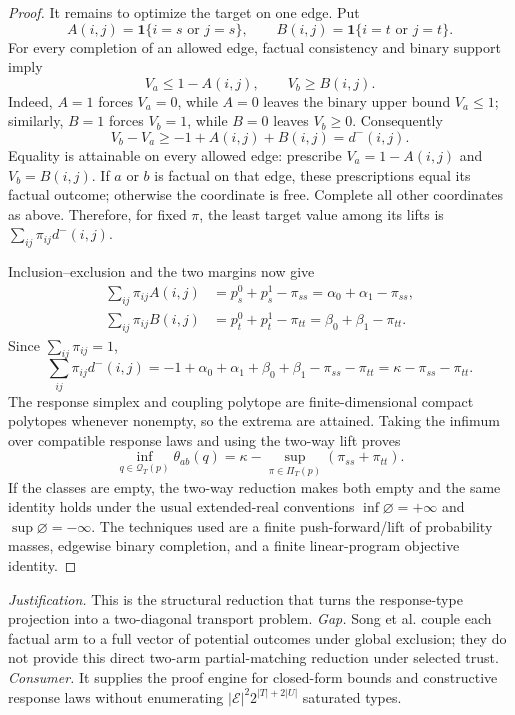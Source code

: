 \documentclass{article}
\begin{document}
\begin{proof}
It remains to optimize the target on one edge.  Put
\[
 A(i,j)=\mathbf 1\{i=s\text{ or }j=s\},
 \qquad
 B(i,j)=\mathbf 1\{i=t\text{ or }j=t\}.
\]
For every completion of an allowed edge, factual consistency and binary
support imply
\[
 V_a\le 1-A(i,j),\qquad V_b\ge B(i,j).
\]
Indeed, \(A=1\) forces \(V_a=0\), while \(A=0\) leaves the binary upper
bound \(V_a\le1\); similarly, \(B=1\) forces \(V_b=1\), while \(B=0\)
leaves \(V_b\ge0\).  Consequently
\[
 V_b-V_a\ge-1+A(i,j)+B(i,j)=d^-(i,j).
\]
Equality is attainable on every allowed edge: prescribe
\(V_a=1-A(i,j)\) and \(V_b=B(i,j)\).  If \(a\) or \(b\) is factual on that
edge, these prescriptions equal its factual outcome; otherwise the
coordinate is free.  Complete all other coordinates as above.  Therefore,
for fixed \(\pi\), the least target value among its lifts is
\(\sum_{ij}\pi_{ij}d^-(i,j)\).

Inclusion--exclusion and the two margins now give
\[
\begin{aligned}
 \sum_{ij}\pi_{ij}A(i,j)
 &=p_s^0+p_s^1-\pi_{ss}=\alpha_0+\alpha_1-\pi_{ss},\\
 \sum_{ij}\pi_{ij}B(i,j)
 &=p_t^0+p_t^1-\pi_{tt}=\beta_0+\beta_1-\pi_{tt}.
\end{aligned}
\]
Since \(\sum_{ij}\pi_{ij}=1\),
\[
 \sum_{ij}\pi_{ij}d^-(i,j)
 =-1+\alpha_0+\alpha_1+\beta_0+\beta_1-\pi_{ss}-\pi_{tt}
 =\kappa-\pi_{ss}-\pi_{tt}.
\]
The response simplex and coupling polytope are finite-dimensional compact
polytopes whenever nonempty, so the extrema are attained.  Taking the
infimum over compatible response laws and using the two-way lift proves
\[
 \inf_{q\in\mathcal Q_T(p)}\theta_{ab}(q)
 =\kappa-\sup_{\pi\in\Pi_T(p)}(\pi_{ss}+\pi_{tt}).
\]
If the classes are empty, the two-way reduction makes both empty and the
same identity holds under the usual extended-real conventions
\(\inf\varnothing=+\infty\) and \(\sup\varnothing=-\infty\).
The techniques used are a finite push-forward/lift of probability masses,
edgewise binary completion, and a finite linear-program objective identity.
\end{proof}
\par\smallskip\noindent \textit{Justification.} This is the structural reduction that turns the response-type projection into a two-diagonal transport problem. \textit{Gap.} Song et al. couple each factual arm to a full vector of potential outcomes under global exclusion; they do not provide this direct two-arm partial-matching reduction under selected trust. \textit{Consumer.} It supplies the proof engine for closed-form bounds and constructive response laws without enumerating \(|\mathcal E|^2 2^{|T|+2|U|}\) saturated types.
\end{document}
